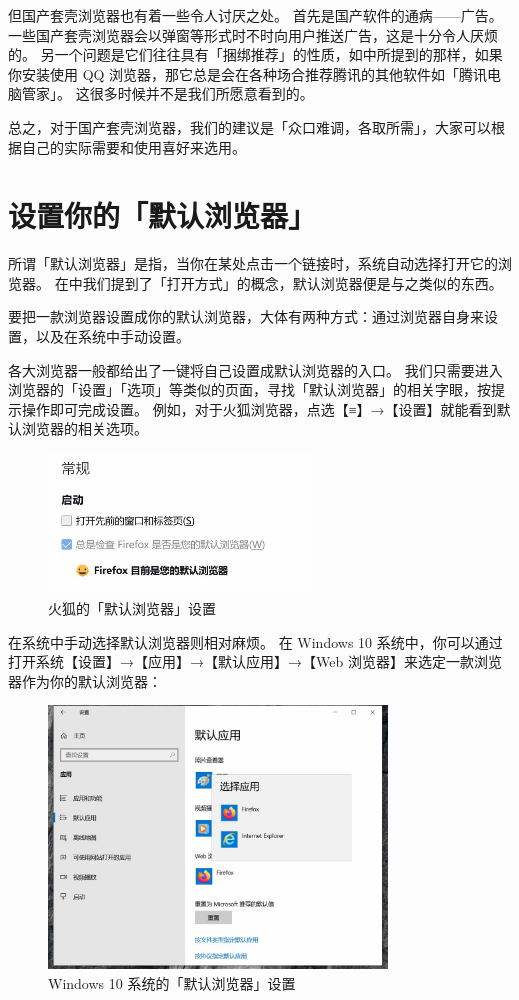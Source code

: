 但国产套壳浏览器也有着一些令人讨厌之处。
首先是国产软件的通病——广告。
一些国产套壳浏览器会以弹窗等形式时不时向用户推送广告，这是十分令人厌烦的。
另一个问题是它们往往具有「捆绑推荐」的性质，如中所提到的那样，如果你安装使用 QQ 浏览器，那它总是会在各种场合推荐腾讯的其他软件如「腾讯电脑管家」。
这很多时候并不是我们所愿意看到的。

总之，对于国产套壳浏览器，我们的建议是「众口难调，各取所需」，大家可以根据自己的实际需要和使用喜好来选用。

\section{设置你的「默认浏览器」}

所谓「默认浏览器」是指，当你在某处点击一个链接时，系统自动选择打开它的浏览器。
在中我们提到了「打开方式」的概念，默认浏览器便是与之类似的东西。

要把一款浏览器设置成你的默认浏览器，大体有两种方式：通过浏览器自身来设置，以及在系统中手动设置。

各大浏览器一般都给出了一键将自己设置成默认浏览器的入口。
我们只需要进入浏览器的「设置」「选项」等类似的页面，寻找「默认浏览器」的相关字眼，按提示操作即可完成设置。
例如，对于火狐浏览器，点选【≡】→【设置】就能看到默认浏览器的相关选项。

\begin{figure}[htb!]
  \centering
  \includegraphics[width=7cm]{assets/Firefox_Default.jpg}
  \caption{火狐的「默认浏览器」设置}
  \label{Firefox_Default}
\end{figure}

在系统中手动选择默认浏览器则相对麻烦。
在 Windows 10 系统中，你可以通过打开系统【设置】→【应用】→【默认应用】→【Web 浏览器】来选定一款浏览器作为你的默认浏览器：

\begin{figure}[htb!]
  \centering
  \includegraphics[width=9cm]{assets/Win_10_Default_Browser.jpg}
  \caption{Windows 10 系统的「默认浏览器」设置}
  \label{Win_10_Default_Browser}
\end{figure}


